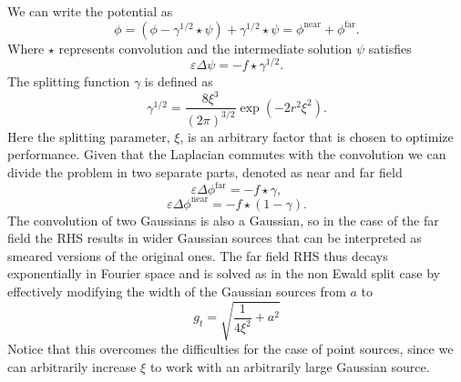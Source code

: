 \documentclass[ twoside,openright,titlepage,numbers=noenddot,%
headinclude,footinclude,cleardoublepage=empty,abstract=on,
BCOR=5mm,paper=a4,fontsize=11pt, dvipsnames
]{scrreprt}
\newcommand{\near}{\textrm{near}}
\newcommand{\far}{\textrm{far}}
\begin{document}
We can write the potential as
\begin{equation}
 \phi=(\phi - \gamma^{1/2}\star\psi) + \gamma^{1/2}\star\psi = \phi^{\near} + \phi^{\far}.
\end{equation}
Where $\star$ represents convolution and the intermediate solution $\psi$ satisfies
 \begin{equation}
 \varepsilon\Delta\psi=-f\star\gamma^{1/2}.
\end{equation}   
The splitting function $\gamma$ is defined as
 \begin{equation}
 \gamma^{1/2} = \frac{8\xi^3}{(2\pi)^{3/2}}\exp\left(-2r^2\xi^2\right).
\end{equation}
Here the splitting parameter, $\xi$, is an arbitrary factor that is chosen to optimize performance. 
Given that the Laplacian commutes with the convolution we can divide the problem in two separate parts, denoted as near and far field  
 \begin{equation}
 \varepsilon\Delta\phi^{\far}=-f\star\gamma,
\end{equation}   
\begin{equation}
 \label{tppoisson_ewald_near}
 \varepsilon\Delta\phi^{\near}=-f\star(1-\gamma).
\end{equation}   
The convolution of two Gaussians is also a Gaussian, so in the case of the far field the RHS results in wider Gaussian sources that can be interpreted as smeared versions of the original ones. The far field RHS thus decays exponentially in Fourier space and is solved as in the non Ewald split case by effectively modifying the width of the Gaussian sources from $a$ to
\begin{equation}
  g_t = \sqrt{\frac{1}{4\xi^2} + a^2}
\end{equation}
Notice that this overcomes the difficulties for the case of point sources, since we can arbitrarily increase $\xi$ to work with an arbitrarily large Gaussian source.
\end{document}
